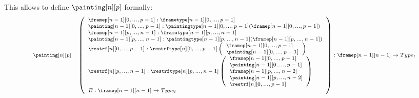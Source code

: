\documentclass{msc}
\begin{document}
\begin{itemize}
        This allows to define $\painting[n][p]$ formally:
        $$
          \fontsize{7.2}{9}\selectfont
          \begin{array}{llcl}
            \painting[n][p]              &
            \multicolumn{3}{l}{
              \left(\begin{array}{l}
                        \framep[n-1][0,...,p-1]:\frametype[n-1][0,...,p-1]                               \\
                        \painting[n-1][0,...,p-1]:\paintingtype[n-1][0,...,p-1](\framep[n-1][0,...,p-1]) \\
                        \framep[n-1][p,...,n-1]:\frametype[n-1][p,...,n-1]                               \\
                        \painting[n-1][p,...,n-1]:\paintingtype[n-1][p,...,n-1](\framep[n-1][p,...,n-1]) \\
                        \restrf[n][0,...,p-1]:\restrftype[n][0,...,p-1]
                        \left(\begin{array}{l}
                            \framep[n-1][0,...,p-1]   \\
                            \painting[n-1][0,...,p-1] \\
                          \end{array}\right)                                                  \\
                        \restrf[n][p,...,n-1]:\restrftype[n][p,...,n-1]
                        \left(\begin{array}{l}
                            \framep[n-1][0,...,p-1]   \\
                            \painting[n-1][0,...,p-1] \\
                            \framep[n-1][p,...,n-2]   \\
                            \painting[n-1][p,...,n-2] \\
                            \restrf[n][0,...,p-1]     \\
                          \end{array}\right)                                                  \\
                        E:\framep[n-1][n-1]\rightarrow Type_l                                            \\
                      \end{array}\right) : \framep[n-1][n-1]\rightarrow Type_l
            }                                                            \\

\end{array}$$
\end{itemize}
\end{document}
